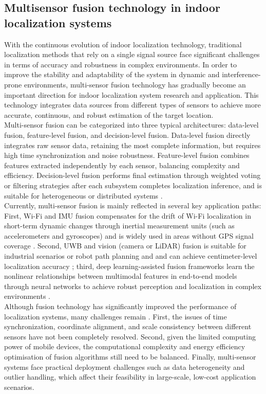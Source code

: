 \documentclass[12pt,a4paper]{article}
\numberwithin{equation}{section}
\begin{document}
\subsection{Multisensor fusion technology in indoor localization systems}
With the continuous evolution of indoor localization technology, traditional localization methods that rely on a single signal source face significant challenges in terms of accuracy and robustness in complex environments. In order to improve the stability and adaptability of the system in dynamic and interference-prone environments, multi-sensor fusion technology has gradually become an important direction for indoor localization system research and application. This technology integrates data sources from different types of sensors to achieve more accurate, continuous, and robust estimation of the target location.\\
Multi-sensor fusion can be categorized into three typical architectures: data-level fusion, feature-level fusion, and decision-level fusion. Data-level fusion directly integrates raw sensor data, retaining the most complete information, but requires high time synchronization and noise robustness. Feature-level fusion combines features extracted independently by each sensor, balancing complexity and efficiency. Decision-level fusion performs final estimation through weighted voting or filtering strategies after each subsystem completes localization inference, and is suitable for heterogeneous or distributed systems \cite{zafari2019survey}.\\
Currently, multi-sensor fusion is mainly reflected in several key application paths: First, Wi-Fi and IMU fusion compensates for the drift of Wi-Fi localization in short-term dynamic changes through inertial measurement units (such as accelerometers and gyroscopes) and is widely used in areas without GPS signal coverage \cite{liu2019fusion}. Second, UWB and vision (camera or LiDAR) fusion is suitable for industrial scenarios or robot path planning and and can achieve centimeter-level localization accuracy \cite{gu2020fusion}; third, deep learning-assisted fusion frameworks learn the nonlinear relationships between multimodal features in end-to-end models through neural networks to achieve robust perception and localization in complex environments \cite{zhou2022deep}.\\
Although fusion technology has significantly improved the performance of localization systems, many challenges remain \cite{zafari2019survey}. First, the issues of time synchronization, coordinate alignment, and scale consistency between different sensors have not been completely resolved. Second, given the limited computing power of mobile devices, the computational complexity and energy efficiency optimisation of fusion algorithms still need to be balanced. Finally, multi-sensor systems face practical deployment challenges such as data heterogeneity and outlier handling, which affect their feasibility in large-scale, low-cost application scenarios.
\end{document}
